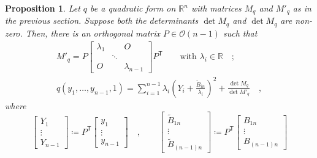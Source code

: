 \documentclass[pdftex,a4paper,12pt]{scrartcl}
\theoremstyle{plain}
\newtheorem{proposition}[theorem]{Proposition}
\theoremstyle{definition}
\theoremstyle{remark}
\numberwithin{equation}{section}
\begin{document}
\begin{proposition}
\label{prop:quad-standard}
Let $q$ be a quadratic form on $\mathbb R^n$ with matrices $M_q$ and $M'_q$ as in the previous section.
Suppose both the determinants $\det M_q$ and $\det M_q$ are non-zero.
Then, there is an orthogonal matrix $P\in\mathcal O(n-1)$ such that
\begin{gather}
\label{eq:M'-diag}
M'_q = P
\begin{bmatrix}
\lambda_1 && O \\
& \ddots & \\
O && \lambda_{n-1}
\end{bmatrix}
P^{\mathsf T}
\qquad\text{with $\lambda_i\in\mathbb R$}
\quad;
\\
\label{eq:q-standard}
q(y_1,\dots,y_{n-1},1)
= \sum_{i=1}^{n-1} \lambda_i\left(Y_i+\frac{\widetilde B_{i n}}{\lambda_i}\right)^2 + \frac{\det M_q}{\det M'_q}
\quad,
\end{gather}
where
\[
\begin{bmatrix}
Y_1\\\vdots\\ Y_{n-1}
\end{bmatrix}
\coloneqq P^{\mathsf T}
\begin{bmatrix}
y_1\\\vdots\\ y_{n-1}
\end{bmatrix}
\quad, \qquad
\begin{bmatrix}
\widetilde B_{1n} \\ \vdots \\ \widetilde B_{(n-1)n}
\end{bmatrix}
\coloneqq P^{\mathsf T}
\begin{bmatrix}
B_{1n} \\ \vdots \\ B_{(n-1)n}
\end{bmatrix}
\]
\end{proposition}
\end{document}

